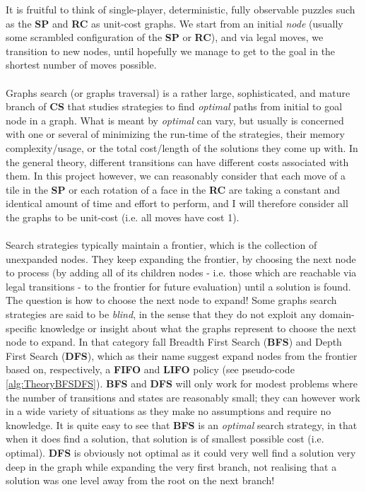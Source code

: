 It is fruitful to think of single-player, deterministic, fully observable puzzles such as the \textbf{SP} and \textbf{RC} as unit-cost graphs. We start from an initial \textit{node} (usually some scrambled configuration of the \textbf{SP} or \textbf{RC}), and via legal moves, we transition to new nodes, until hopefully we manage to get to the goal in the shortest number of moves possible. 
\\
\\
Graphs search (or graphs traversal) is a rather large, sophisticated, and mature branch of \textbf{CS} that studies strategies to find \textit{optimal} paths from initial to goal node in a graph. What is meant by \textit{optimal} can vary, but usually is concerned with one or several of minimizing the run-time of the strategies, their memory complexity/usage, or the total cost/length of the solutions they come up with. In the general theory, different transitions can have different costs associated with them. In this project however, we can reasonably consider that each move of a tile in the \textbf{SP} or each rotation of a face in the \textbf{RC} are taking a constant and identical amount of time and effort to perform, and I will therefore consider all the graphs to be unit-cost (i.e. all moves have cost 1).
\\
\\
Search strategies typically maintain a frontier, which is the collection of unexpanded nodes. They keep expanding the frontier, by choosing the next node to process (by adding all of its children nodes - i.e. those which are reachable via legal transitions - to the frontier for future evaluation) until a solution is found. The question is how to choose the next node to expand! Some graphs search strategies are said to be \textit{blind}, in the sense that they do not exploit any domain-specific knowledge or insight about what the graphs represent to choose the next node to expand. In that category fall Breadth First Search (\textbf{BFS}) and Depth First Search (\textbf{DFS}), which as their name suggest expand nodes from the frontier based on, respectively, a \textbf{FIFO} and \textbf{LIFO} policy (see pseudo-code \ref{alg:TheoryBFSDFS}). \textbf{BFS} and \textbf{DFS} will only work for modest problems where the number of transitions and states are reasonably small; they can however work in a wide variety of situations as they make no assumptions and require no knowledge. It is quite easy to see that \textbf{BFS} is an \textit{optimal} search strategy, in that when it does find a solution, that solution is of smallest possible cost (i.e. optimal). \textbf{DFS} is obviously not optimal as it could very well find a solution very deep in the graph while expanding the very first branch, not realising that a solution was one level away from the root on the next branch!
